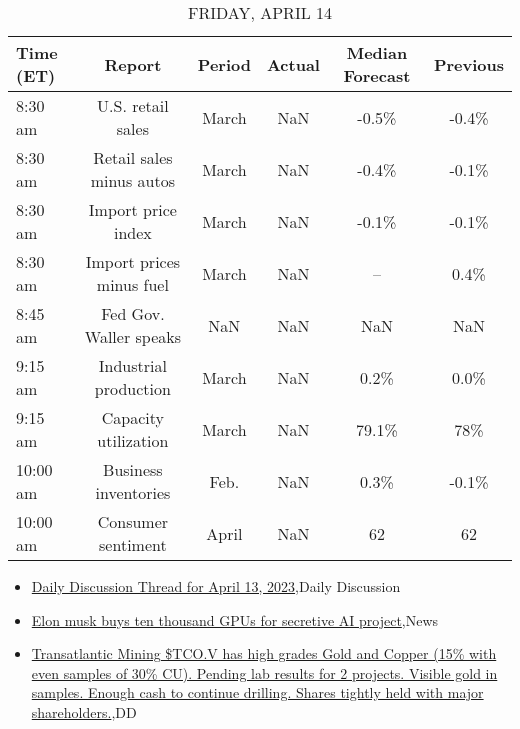 \documentclass{article}%
\begin{document}
%


\begin{table}[htbp]%
\caption{FRIDAY, APRIL 14}%
\centering%
\begin{adjustbox}{width=1\textwidth}%
\begin{tabular}{lccccc}
\toprule
Time (ET) &                   Report & Period & Actual & Median Forecast & Previous \\
\midrule
  8:30 am &        U.S. retail sales &  March &    NaN &           -0.5\% &    -0.4\% \\
  8:30 am & Retail sales minus autos &  March &    NaN &           -0.4\% &    -0.1\% \\
  8:30 am &       Import price index &  March &    NaN &           -0.1\% &    -0.1\% \\
  8:30 am & Import prices minus fuel &  March &    NaN &              -- &     0.4\% \\
  8:45 am &   Fed Gov. Waller speaks &    NaN &    NaN &             NaN &      NaN \\
  9:15 am &    Industrial production &  March &    NaN &            0.2\% &     0.0\% \\
  9:15 am &     Capacity utilization &  March &    NaN &           79.1\% &      78\% \\
 10:00 am &     Business inventories &   Feb. &    NaN &            0.3\% &    -0.1\% \\
 10:00 am &       Consumer sentiment &  April &    NaN &              62 &       62 \\
\bottomrule
\end{tabular}
%
\end{adjustbox}%
\end{table}

%
\begin{itemize}%
\item%
\href{https://reddit.com/r/wallstreetbets/comments/12kjic2/daily\_discussion\_thread\_for\_april\_13\_2023/}{Daily Discussion Thread for April 13, 2023},Daily Discussion%
\item%
\href{https://reddit.com/r/wallstreetbets/comments/12kiqaf/elon\_musk\_buys\_ten\_thousand\_gpus\_for\_secretive\_ai/}{Elon musk buys ten thousand GPUs for secretive AI project},News%
\item%
\href{https://reddit.com/r/Baystreetbets/comments/12jzrjh/transatlantic\_mining\_tcov\_has\_high\_grades\_gold/}{Transatlantic Mining \$TCO.V has high grades Gold and Copper (15\% with even samples of 30\% CU). Pending lab results for 2 projects. Visible gold in samples. Enough cash to continue drilling. Shares tightly held with major shareholders.},DD%
\end{itemize}%
\end{document}
